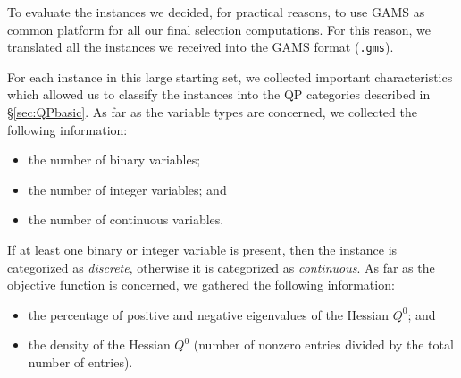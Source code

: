 To evaluate the instances we decided, for practical reasons, to use
GAMS as common platform for all our final selection computations.
For this reason, we translated all the
instances we received into the GAMS format (\texttt{.gms}).
%


For each instance in this large starting set,
we collected important characteristics
which allowed us to classify the instances into the QP categories described in
\S\ref{sec:QPbasic}. As far as the variable types are concerned, we
collected the following information:
%
\begin{itemize}
 \item the number of binary variables; %
 \item the number of integer variables; and %
 \item the number of continuous variables. %
\end{itemize}
%
If at least one binary or integer variable is present, then the instance is
categorized as \emph{discrete}, otherwise it is categorized as \emph{continuous}.
As far as the objective function is concerned, we gathered the following
information:
%
\begin{itemize}
 \item the percentage of positive and negative eigenvalues of the Hessian
      $Q^0$; and
 \item the density of the Hessian $Q^0$ (number of nonzero entries divided by the total
       number of entries). %
\end{itemize}
%

